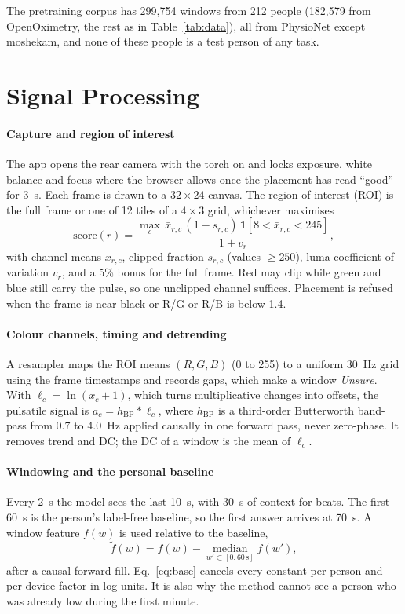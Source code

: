 \documentclass[11pt,letterpaper]{article}
\begin{document}
The pretraining corpus has 299,754 windows from 212 people (182,579 from OpenOximetry, the rest as in Table~\ref{tab:data}), all from PhysioNet \cite{goldberger2000} except moshekam, and none of these people is a test person of any task.

\section{Signal Processing}\label{sec:signal}
\paragraph{Capture and region of interest} The app opens the rear camera with the torch on and locks exposure, white balance and focus where the browser allows once the placement has read ``good'' for 3~s. Each frame is drawn to a $32\times24$ canvas. The region of interest (ROI) is the full frame or one of 12 tiles of a $4\times3$ grid, whichever maximises
\begin{equation}
\mathrm{score}(r)=\frac{\max_{c}\,\bar x_{r,c}\,(1-s_{r,c})\,\mathbf{1}[8<\bar x_{r,c}<245]}{1+v_r},
\end{equation}
with channel means $\bar x_{r,c}$, clipped fraction $s_{r,c}$ (values $\ge250$), luma coefficient of variation $v_r$, and a 5\% bonus for the full frame. Red may clip while green and blue still carry the pulse, so one unclipped channel suffices. Placement is refused when the frame is near black or R/G or R/B is below 1.4.

\paragraph{Colour channels, timing and detrending} A resampler maps the ROI means $(R,G,B)$ (0 to 255) to a uniform 30~Hz grid using the frame timestamps and records gaps, which make a window \emph{Unsure}. With $\ell_c=\ln(x_c+1)$, which turns multiplicative changes into offsets, the pulsatile signal is $a_c=h_{\mathrm{BP}}*\ell_c$, where $h_{\mathrm{BP}}$ is a third-order Butterworth band-pass from 0.7 to 4.0~Hz applied causally in one forward pass, never zero-phase. It removes trend and DC; the DC of a window is the mean of $\ell_c$.

\paragraph{Windowing and the personal baseline} Every 2~s the model sees the last 10~s, with 30~s of context for beats. The first 60~s is the person's label-free baseline, so the first answer arrives at 70~s. A window feature $f(w)$ is used relative to the baseline,
\begin{equation}
\tilde f(w)=f(w)-\operatorname*{median}_{w'\subset[0,60\,\mathrm{s}]} f(w'),\label{eq:base}
\end{equation}
after a causal forward fill. Eq.~\eqref{eq:base} cancels every constant per-person and per-device factor in log units. It is also why the method cannot see a person who was already low during the first minute.
\end{document}

